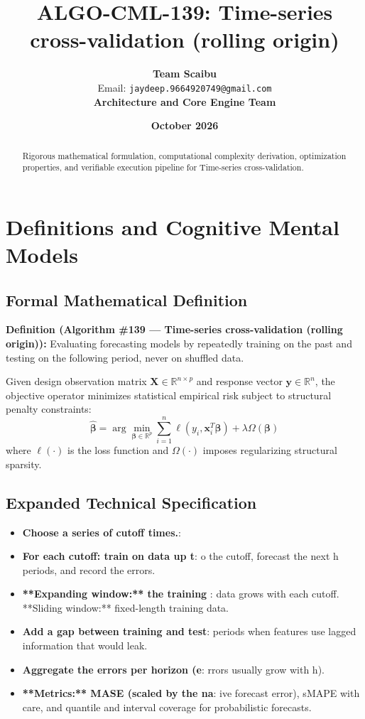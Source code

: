 \documentclass[11pt,a4paper]{article}
\title{\textbf{ALGO-CML-139: Time-series cross-validation (rolling origin)}}
\author{\textbf{Team Scaibu} \\ \small Email: \texttt{jaydeep.9664920749@gmail.com} \\ \small \textbf{Architecture and Core Engine Team}}
\date{\textbf{October 2026}}
\theoremstyle{definition}
\begin{document}
\maketitle

\begin{abstract}
Rigorous mathematical formulation, computational complexity derivation, optimization properties, and verifiable execution pipeline for Time-series cross-validation.
\end{abstract}

\section{Definitions and Cognitive Mental Models}

\subsection{Formal Mathematical Definition}
\textbf{Definition (Algorithm \#139 --- Time-series cross-validation (rolling origin)):}
Evaluating forecasting models by repeatedly training on the past and testing on the following period, never on shuffled data.

Given design observation matrix $\mathbf{X} \in \mathbb{R}^{n \times p}$ and response vector $\mathbf{y} \in \mathbb{R}^n$, the objective operator minimizes statistical empirical risk subject to structural penalty constraints:
\begin{equation}
\hat{\boldsymbol{\beta}} = \arg\min_{\boldsymbol{\beta} \in \mathbb{R}^p} \sum_{i=1}^n \ell(y_i, \mathbf{x}_i^T \boldsymbol{\beta}) + \lambda \Omega(\boldsymbol{\beta})
\end{equation}
where $\ell(\cdot)$ is the loss function and $\Omega(\cdot)$ imposes regularizing structural sparsity.

\subsection{Expanded Technical Specification}
\begin{itemize}
\item \textbf{Choose a series of cutoff times.}: 
\item \textbf{For each cutoff: train on data up t}: o the cutoff, forecast the next h periods, and record the errors.
\item \textbf{**Expanding window:** the training }: data grows with each cutoff. **Sliding window:** fixed-length training data.
\item \textbf{Add a gap between training and test}:  periods when features use lagged information that would leak.
\item \textbf{Aggregate the errors per horizon (e}: rrors usually grow with h).
\item \textbf{**Metrics:** MASE (scaled by the na}: ive forecast error), sMAPE with care, and quantile and interval coverage for probabilistic forecasts.
\end{itemize}
\end{document}
